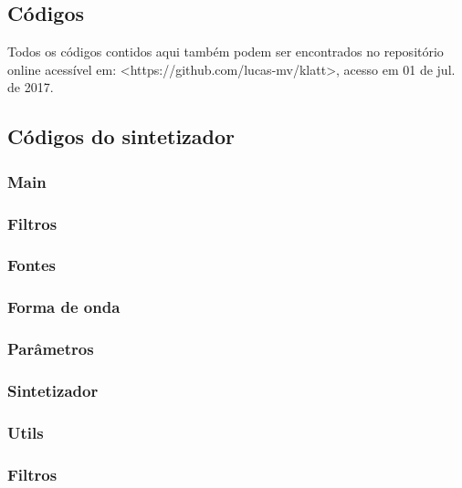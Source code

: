 \documentclass[
  12pt,       
  openright,      
  twoside,      
  a4paper,      
  english,      
  french,       
  spanish,      
  brazil,     
  ]{abntex2}
\begin{document}
\postextual



\begin{apendicesenv}
\partapendices

\chapter{Códigos}
\label{sec:apendice1}

Todos os códigos contidos aqui também podem ser encontrados no repositório online acessível em: <https://github.com/lucas-mv/klatt>, acesso em 01 de jul. de 2017.

\section{Códigos do sintetizador}
\subsection{Main}

\subsection{Filtros}

\subsection{Fontes}

\subsection{Forma de onda}

\subsection{Parâmetros}

\subsection{Sintetizador}

\subsection{Utils}

\subsection{Filtros}



\end{apendicesenv}
\end{document}
